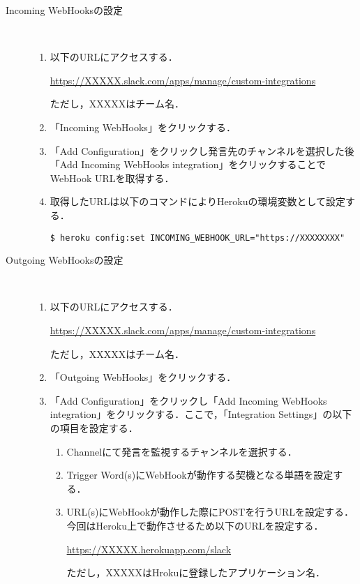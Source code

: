 \documentclass[fleqn, 14pt]{extarticlej}
\begin{document}
\begin{description}
\item[Incoming WebHooksの設定]\
  
  \begin{enumerate}
  \item 以下のURLにアクセスする．
    
    \url{https://XXXXX.slack.com/apps/manage/custom-integrations}

    ただし，XXXXXはチーム名．
    
  \item 「Incoming WebHooks」をクリックする．
  \item 「Add Configuration」をクリックし発言先のチャンネルを選択した後「Add Incoming WebHooks integration」をクリックすることでWebHook URLを取得する．
  \item 取得したURLは以下のコマンドによりHerokuの環境変数として設定する．

    \verb|$ heroku config:set INCOMING_WEBHOOK_URL="https://XXXXXXXX"| 
  \end{enumerate}
\item[Outgoing WebHooksの設定]\
  
  \begin{enumerate}
  \item 以下のURLにアクセスする．
    
    \url{https://XXXXX.slack.com/apps/manage/custom-integrations}

    ただし，XXXXXはチーム名．
    
  \item 「Outgoing WebHooks」をクリックする．
  \item 「Add Configuration」をクリックし「Add Incoming WebHooks integration」をクリックする．ここで，「Integration Settings」の以下の項目を設定する．
    \begin{enumerate}
    \item Channelにて発言を監視するチャンネルを選択する．
    \item Trigger Word(s)にWebHookが動作する契機となる単語を設定する．
    \item URL(s)にWebHookが動作した際にPOSTを行うURLを設定する．今回はHeroku上で動作させるため以下のURLを設定する．

      \url{https://XXXXX.herokuapp.com/slack}
      
      ただし，XXXXXはHrokuに登録したアプリケーション名．
    \end{enumerate}
  \end{enumerate}
\end{description}
\end{document}
